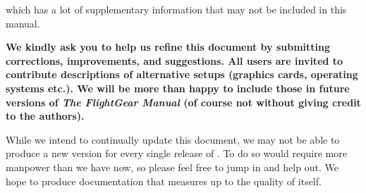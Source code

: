 
which has a lot of supplementary information that may not be included in this manual.

\textbf{We kindly ask you to help us refine this document by submitting corrections,
improvements, and suggestions. All users are invited to contribute
descriptions of alternative setups (graphics cards, operating systems
etc.). We will be more than happy to include those in future versions
of \textit{The FlightGear Manual} (of course not without giving credit
to the authors).}

While we intend to continually update this document, we may not be able to produce a
new version for every single release of {\FlightGear{}}.  To do so would require more
manpower than we have now, so please feel free to jump in and help out.  We hope to
produce documentation that measures up to the quality of \FlightGear{} itself.



